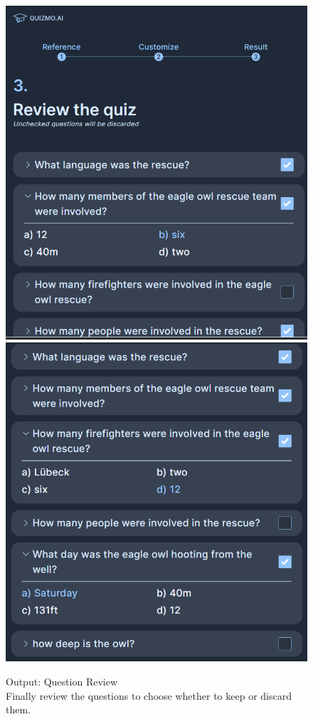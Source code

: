 \documentclass[12pt]{report}
\begin{document}
\begin{figure}[ht!]
    \centering
    \includegraphics[scale = 0.4]{Images/review.png}
    \includegraphics[scale = 0.42]{Images/review2.png}
    \captionsetup{justification=centering} 
    \caption{Output: Question Review \\ Finally review the questions to choose whether to keep or discard them.}
\end{figure}
\end{document}
